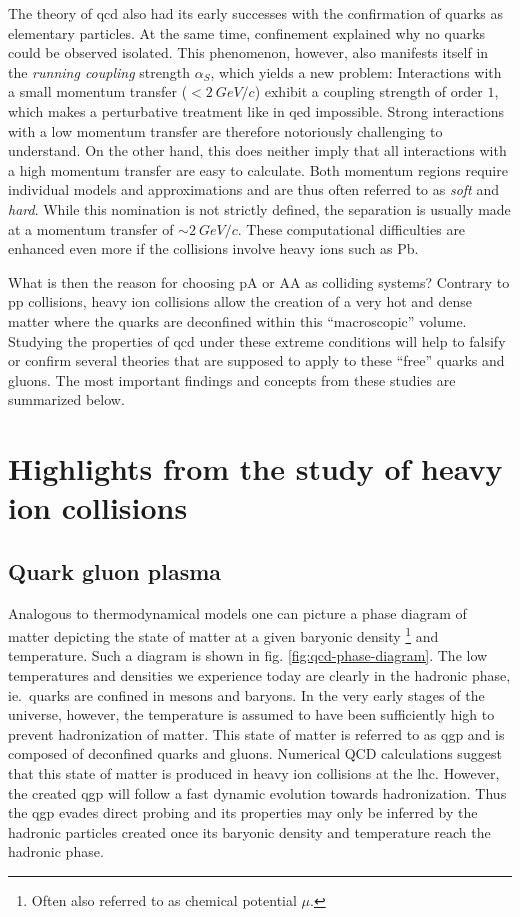 The theory of \gls{qcd} also had its early successes with the confirmation of quarks as elementary particles. At the same time, confinement explained why no quarks could be observed isolated. This phenomenon, however, also manifests itself in the \emph{running coupling} strength $\alpha_S$,  which yields a new problem: Interactions with a small momentum transfer ($< \SI{2}{GeV/c}$) exhibit a coupling strength of order $1$, which makes a perturbative treatment like in \gls{qed} impossible. Strong interactions with a low momentum transfer are therefore notoriously challenging to understand. On the other hand, this does neither imply that all interactions with a high momentum transfer are easy to calculate. Both momentum regions require individual models and approximations and are thus often referred to as \emph{soft} and \emph{hard}. While this nomination is not strictly defined, the separation is usually made at a momentum transfer of $\sim \SI{2}{GeV/c}$. These computational difficulties are enhanced even more if the collisions involve heavy ions such as \gls{Pb}. 

What is then the reason for choosing \gls{pA} or \gls{AA} as colliding systems? Contrary to \gls{pp} collisions, heavy ion collisions allow the creation of a very hot and dense matter where the quarks are deconfined within this ``macroscopic'' volume. Studying the properties of \gls{qcd} under these extreme conditions will help to falsify or confirm several theories that are supposed to apply to these ``free'' quarks and gluons. The most important findings and concepts from these studies are summarized below.

\section{Highlights from the study of heavy ion collisions}
\label{sec:important_results}

\subsection{Quark gluon plasma}
\label{sec:QGP}

Analogous to thermodynamical models one can picture a phase diagram of matter depicting the state of matter at a given baryonic density \footnote{Often also referred to as chemical potential $\mu$.} and temperature. Such a diagram is shown in fig. \ref{fig:qcd-phase-diagram}. The low temperatures and densities we experience today are clearly in the hadronic phase, ie.\ quarks are confined in mesons and baryons. In the very early stages of the universe, however, the temperature is assumed to have been sufficiently high to prevent hadronization of matter. This state of matter is referred to as \gls{qgp} and is composed of deconfined quarks and gluons. Numerical QCD calculations suggest that this state of matter is produced in heavy ion collisions at the \gls{lhc}. However, the created \gls{qgp} will follow a fast dynamic evolution towards hadronization. Thus the \gls{qgp} evades direct probing and its properties may only be inferred by the hadronic particles created once its  baryonic density and temperature reach the hadronic phase.

